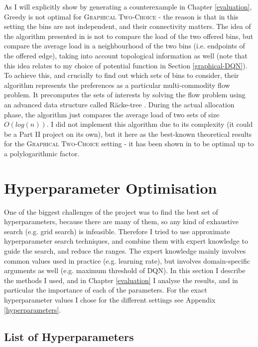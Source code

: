 As I will explicitly show by generating a counterexample in Chapter \ref{evaluation}, Greedy is not optimal for \textsc{Graphical Two-Choice} - the reason is that in this setting the bins are not independent, and their connectivity matters. The idea of the algorithm presented in \cite{bansal2021twochoicegraphical} is not to compare the load of the two offered bins, but compare the average load in a neighbourhood of the two bins (i.e. endpoints of the offered edge), taking into account topological information as well (note that this idea relates to my choice of potential function in Section \ref{graphical-DQN}). To achieve this, and crucially to find out which sets of bins to consider, their algorithm represents the preferences as a particular multi-commodity flow problem. It precomputes the sets of interests by solving the flow problem using an advanced data structure called R\"{a}cke-tree \cite{racke2008racketree}. During the actual allocation phase, the algorithm just compares the average load of two sets of size $O(log(n))$. I did not implement this algorithm due to its complexity (it could be a Part II project on its own), but it here as the best-known theoretical results for the \textsc{Graphical Two-Choice} setting - it has been shown in \cite{bansal2021twochoicegraphical} to be optimal up to a polylogarithmic factor.



\section{Hyperparameter Optimisation}

One of the biggest challenges of the project was to find the best set of hyperparameters, because there are many of them, so any kind of exhaustive search (e.g. grid search) is infeasible. Therefore I tried to use approximate hyperparameter search techniques, and combine them with expert knowledge to guide the search, and reduce the ranges. The expert knowledge mainly involves common values used in practice (e.g. learning rate), but involves domain-specific arguments as well (e.g. maximum threshold of DQN). In this section I describe the methods I used, and in Chapter \ref{evaluation} I analyse the results, and in particular the importance of each of the parameters. For the exact hyperparameter values I chose for the different settings see Appendix \ref{hyperparameters}.


\subsection{List of Hyperparameters}


